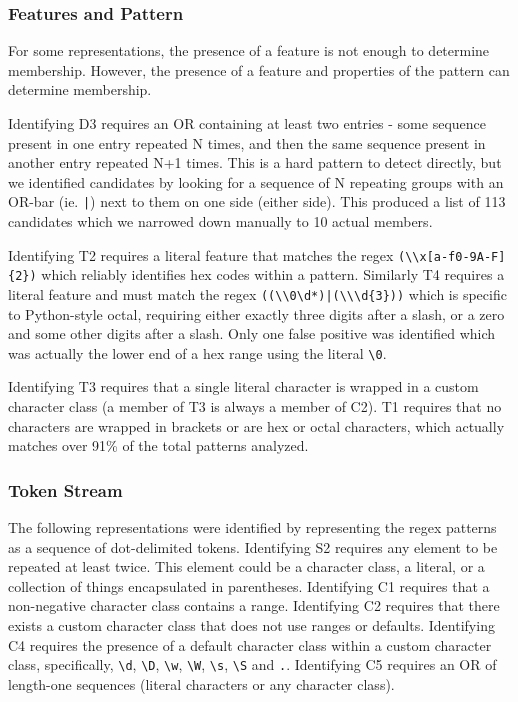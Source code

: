 \subsubsection{Features  and Pattern}
For some representations, the presence of a feature is not enough to determine membership.
However,  the presence of a feature and properties of the pattern can determine membership.

Identifying D3 requires an OR containing at least two entries - some sequence present in one entry repeated N times, and then the same sequence present in another entry repeated N+1 times.  This is a hard pattern to detect directly, but we identified candidates by looking for a sequence of N repeating groups with an OR-bar (ie. \verb!|!) next to them on one side (either side).  This produced a list of 113 candidates which we narrowed down manually to 10 actual members.

Identifying T2 requires a literal feature that matches the regex \verb!(\\x[a-f0-9A-F]{2})! which reliably identifies hex codes within a pattern.
Similarly T4 requires a literal feature and must match the regex \verb!((\\0\d*)|(\\\d{3}))! which is specific to Python-style octal, requiring either exactly three digits after a slash, or a zero and some other digits after a slash.  Only one false positive was identified which was actually the lower end of a hex range using the literal \verb!\0!.

Identifying T3 requires that a single literal character is wrapped in a custom character class (a member of T3 is always a member of C2).
 T1 requires that no characters are wrapped in brackets or are hex or octal characters, which actually matches over 91\% of the total patterns analyzed.

\subsubsection{Token Stream }
The following representations were identified by representing the regex patterns as a sequence of dot-delimited tokens.
Identifying S2 requires any element to be repeated at least twice. This element could be a character class, a literal, or a collection of things encapsulated in parentheses.
Identifying C1 requires that a non-negative character class contains a range.  Identifying C2 requires that there exists a custom character class that does not use ranges or defaults. Identifying C4 requires the presence of a default character class within a custom character class, specifically, \verb!\d!, \verb!\D!, \verb!\w!, \verb!\W!, \verb!\s!, \verb!\S! and \verb!.!.  Identifying C5 requires an OR of length-one sequences (literal characters or any character class).
